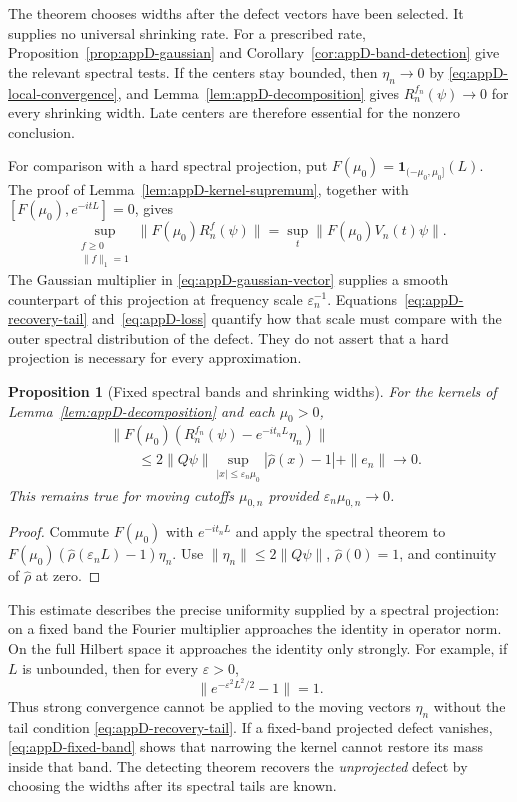 \documentclass[a4paper,11pt]{article}
\newtheorem{proposition}[theorem]{Proposition}
\theoremstyle{definition}
\begin{document}
The theorem chooses widths after the defect vectors have been selected. It supplies no universal shrinking rate. For a prescribed rate, Proposition~\ref{prop:appD-gaussian} and Corollary~\ref{cor:appD-band-detection} give the relevant spectral tests. If the centers stay bounded, then $\eta_n\to0$ by \eqref{eq:appD-local-convergence}, and Lemma~\ref{lem:appD-decomposition} gives $R_n^{f_n}(\psi)\to0$ for every shrinking width. Late centers are therefore essential for the nonzero conclusion.

For comparison with a hard spectral projection, put
$F(\mu_0)=\mathbf1_{(-\mu_0,\mu_0]}(L)$.
The proof of Lemma~\ref{lem:appD-kernel-supremum}, together with $[F(\mu_0),e^{-itL}]=0$, gives
\begin{equation}
 \sup_{\substack{f\ge0\\\|f\|_1=1}}\|F(\mu_0) R_n^f(\psi)\|
 =\sup_t\|F(\mu_0)V_n(t)\psi\|.
 \label{eq:appD-hard-projection}
\end{equation}
The Gaussian multiplier in \eqref{eq:appD-gaussian-vector} supplies a smooth counterpart of this projection at frequency scale $\varepsilon_n^{-1}$. Equations~\eqref{eq:appD-recovery-tail} and~\eqref{eq:appD-loss} quantify how that scale must compare with the outer spectral distribution of the defect. They do not assert that a hard projection is necessary for every approximation.


\begin{proposition}[Fixed spectral bands and shrinking widths]
\label{prop:appD-fixed-band}
For the kernels of Lemma~\ref{lem:appD-decomposition} and each $\mu_0>0$,
\begin{align}
 &\|F(\mu_0)(R_n^{f_n}(\psi)-e^{-it_nL}\eta_n)\|\nonumber\\
 &\qquad\le
 2\|Q\psi\|\sup_{|x|\le\varepsilon_n\mu_0}
       |\widehat\rho(x)-1|+\|e_n\|\longrightarrow0.
 \label{eq:appD-fixed-band}
\end{align}
This remains true for moving cutoffs $\mu_{0,n}$ provided
$\varepsilon_n\mu_{0,n}\to0$.
\end{proposition}
\begin{proof}
Commute $F(\mu_0)$ with $e^{-it_nL}$ and apply the spectral theorem to
$F(\mu_0)(\widehat\rho(\varepsilon_nL)-1)\eta_n$.
Use $\|\eta_n\|\le2\|Q\psi\|$, $\widehat\rho(0)=1$, and continuity of
$\widehat\rho$ at zero.
\end{proof}

This estimate describes the precise uniformity supplied by a spectral projection:
on a fixed band the Fourier multiplier approaches the identity in operator norm.
On the full Hilbert space it approaches the identity only strongly. For example,
if $L$ is unbounded, then for every $\varepsilon>0$,
\[
 \|e^{-\varepsilon^2L^2/2}-1\|=1.
\]
Thus strong convergence cannot be applied to the moving vectors $\eta_n$ without
the tail condition \eqref{eq:appD-recovery-tail}. If a fixed-band projected defect
vanishes, \eqref{eq:appD-fixed-band} shows that narrowing the kernel cannot
restore its mass inside that band. The detecting theorem recovers the
\emph{unprojected} defect by choosing the widths after its spectral tails are known.
\end{document}
